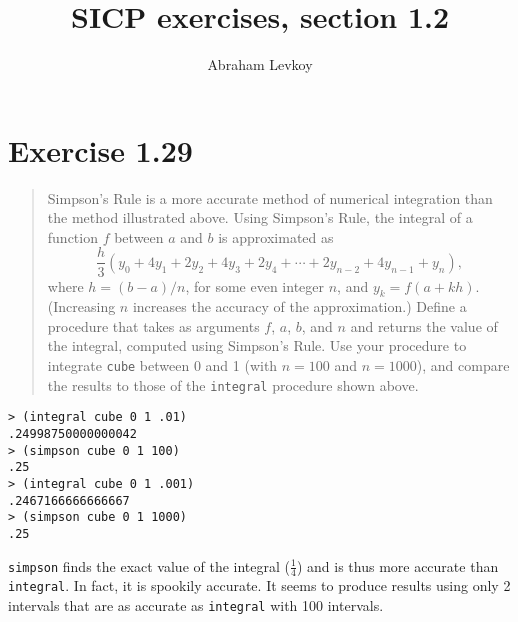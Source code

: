 \documentclass{article}
\author{Abraham Levkoy}
\title{SICP exercises, section 1.2}
\begin{document}
\maketitle

\section{Exercise 1.29}
\begin{quote}
    Simpson's Rule is a more accurate method of numerical integration than the
    method illustrated above. Using Simpson's Rule, the integral of a function
    $f$ between $a$ and $b$ is approximated as
    \begin{equation*}
        \frac{h}{3}(y_0+4y_1+2y_2+4y_3+2y_4+\cdots+2y_{n-2}+4y_{n-1}+y_n),
    \end{equation*}
    where $h=(b−a)/n$, for some even integer $n$, and $y_k=f(a+kh)$.
    (Increasing $n$ increases the accuracy of the approximation.) Define a
    procedure that takes as arguments $f$, $a$, $b$, and $n$ and returns the
    value of the integral, computed using Simpson’s Rule. Use your procedure to
    integrate \texttt{cube} between 0 and 1 (with $n=100$ and $n=1000$), and
    compare the results to those of the \texttt{integral} procedure shown
    above.
\end{quote}



\begin{lstlisting}
> (integral cube 0 1 .01)
.24998750000000042
> (simpson cube 0 1 100)
.25
> (integral cube 0 1 .001)
.2467166666666667
> (simpson cube 0 1 1000)
.25
\end{lstlisting}

\texttt{simpson} finds the exact value of the integral ($\frac{1}{4}$) and is
thus more accurate than \texttt{integral}. In fact, it is spookily accurate. It
seems to produce results using only 2 intervals that are as accurate as
\texttt{integral} with 100 intervals.
\end{document}

